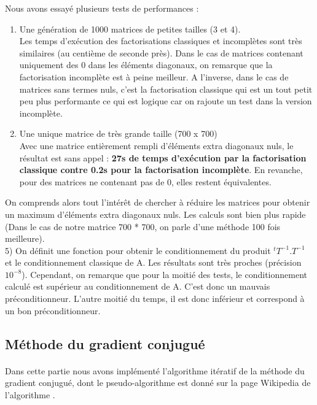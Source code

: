 \documentclass{article}
\begin{document}
  Nous avons essayé plusieurs tests de performances :
  \begin{enumerate}
      \item Une génération de 1000 matrices de petites tailles (3 et 4). \\
      Les temps d'exécution des factorisations classiques et incomplètes sont très similaires (au centième de seconde près).
      Dans le cas de matrices contenant uniquement des 0 dans les éléments diagonaux, on remarque que la factorisation incomplète est à peine meilleur. A l'inverse, dans le cas de matrices sans termes nuls, c'est la factorisation classique qui est un tout petit peu plus performante ce qui est logique car on rajoute un test dans la version incomplète. \\
      
      \item Une unique matrice de très grande taille (700 x 700) \\
      Avec une matrice entièrement rempli d'éléments extra diagonaux nuls, le résultat est sans appel : \textbf{27s de temps d'exécution par la factorisation classique contre 0.2s pour la factorisation incomplète}.
      En revanche, pour des matrices ne contenant pas de 0, elles restent équivalentes.
  \end{enumerate}
  
  On comprends alors tout l'intérêt de chercher à réduire les matrices pour obtenir un maximum d'éléments extra diagonaux nuls. Les calculs sont bien plus rapide (Dans le cas de notre matrice 700 * 700, on parle d'une méthode 100 fois meilleure). \\
  
5) On définit une fonction pour obtenir le conditionnement du produit \(^tT^{-1} . T^{-1}\) et le conditionnement classique de A. Les résultats sont très proches (précision \(10^{-8}\)). Cependant, on remarque que pour la moitié des tests, le conditionnement calculé est supérieur au conditionnement de A. C'est donc un mauvais préconditionneur. L'autre moitié du temps, il est donc inférieur et correspond à un bon préconditionneur.


    
\subsection*{Méthode du gradient conjugué}
\paragraph{}
    Dans cette partie nous avons implémenté l'algorithme itératif de la méthode du gradient conjugué, dont le pseudo-algorithme est donné sur la page Wikipedia de l'algorithme \cite{gradconjugwiki}.
\end{document}
